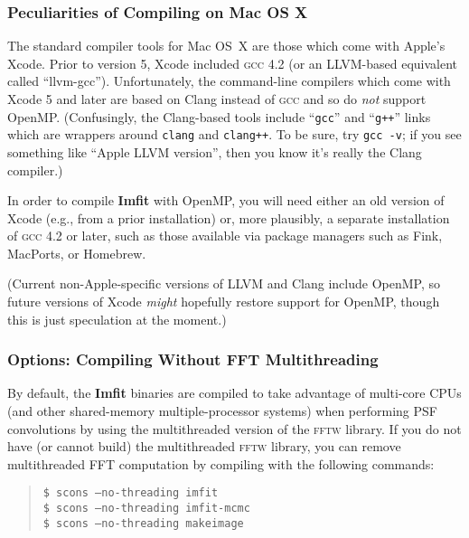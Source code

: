 \documentclass[10pt,a4paper,article]{memoir}
\newcommand{\imfit}{\textbf{Imfit}}
\newcommand{\Imfit}{\textbf{Imfit}}
\begin{document}
\subsubsection{Peculiarities of Compiling on Mac OS X}

The standard compiler tools for Mac OS~X are those which come with
Apple's Xcode. Prior to version 5, Xcode included \textsc{gcc} 4.2 (or
an LLVM-based equivalent called ``llvm-gcc''). Unfortunately, the
command-line compilers which come with Xcode 5 and later are based on
Clang instead of \textsc{gcc} and so do \textit{not} support OpenMP.
(Confusingly, the Clang-based tools include ``\texttt{gcc}'' and
``\texttt{g++}'' links which are wrappers around \texttt{clang} and
\texttt{clang++}. To be sure, try \texttt{gcc -v}; if you see something
like ``Apple LLVM version'', then you know it's really the Clang
compiler.)

In order to compile \imfit{} with OpenMP, you will need either an
old version of Xcode (e.g., from a prior installation) or, more plausibly, a
separate installation of \textsc{gcc} 4.2 or later, such as those
available via package managers such as Fink, MacPorts, or Homebrew.

(Current non-Apple-specific versions of LLVM and Clang include OpenMP, so
future versions of Xcode \textit{might} hopefully restore support for
OpenMP, though this is just speculation at the moment.)



\subsubsection{Options: Compiling Without FFT Multithreading}

By default, the \Imfit{} binaries are compiled to take advantage of multi-core CPUs (and other
shared-memory multiple-processor systems) when performing PSF convolutions by using the 
multithreaded version of the
\textsc{fftw} library. If you do not have (or cannot build) the multithreaded \textsc{fftw} library,
you can remove multithreaded FFT computation by compiling with the following commands:
\begin{quote}
\texttt{\$ scons --no-threading imfit} \\
\texttt{\$ scons --no-threading imfit-mcmc} \\
\texttt{\$ scons --no-threading makeimage}
\end{quote}

\end{document}
